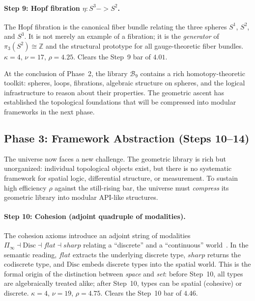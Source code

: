\documentclass[11pt,a4paper]{article}
\def\to{->}%
\def\flat{flat}%
\def\sharp{sharp}%
\theoremstyle{plain}
\theoremstyle{definition}
\theoremstyle{remark}
\newcommand{\Z}{\mathbb{Z}}
\newcommand{\Disc}{\mathrm{Disc}}
\newcommand{\B}{\mathcal{B}}
\begin{document}
\paragraph{Step 9: Hopf fibration $\eta : S^3 \to S^2$.}  The Hopf fibration is the canonical fiber bundle relating the three spheres $S^1$, $S^2$, and $S^3$.  It is not merely an example of a fibration; it is the \emph{generator} of $\pi_3(S^2) \cong \Z$ and the structural prototype for all gauge-theoretic fiber bundles.  $\kappa = 4$, $\nu = 17$, $\rho = 4.25$.  Clears the Step~9 bar of $4.01$.

At the conclusion of Phase~2, the library $\B_9$ contains a rich homotopy-theoretic toolkit: spheres, loops, fibrations, algebraic structure on spheres, and the logical infrastructure to reason about their properties.  The geometric ascent has established the topological foundations that will be compressed into modular frameworks in the next phase.


\subsection{Phase 3: Framework Abstraction (Steps 10--14)}
\label{sec:framework-abstraction}

The universe now faces a new challenge.  The geometric library is rich but unorganized: individual topological objects exist, but there is no systematic framework for spatial logic, differential structure, or measurement.  To sustain high efficiency $\rho$ against the still-rising bar, the universe must \emph{compress} its geometric library into modular API-like structures.

\paragraph{Step 10: Cohesion (adjoint quadruple of modalities).}  The cohesion axioms introduce an adjoint string of modalities $\Pi_{\!\infty} \dashv \Disc \dashv \flat \dashv \sharp$ relating a ``discrete'' and a ``continuous'' world~\cite{schreiber2013}.  In the semantic reading, $\flat$ extracts the underlying discrete type, $\sharp$ returns the codiscrete type, and $\Disc$ embeds discrete types into the spatial world.  This is the formal origin of the distinction between \emph{space} and \emph{set}: before Step~10, all types are algebraically treated alike; after Step~10, types can be spatial (cohesive) or discrete.  $\kappa = 4$, $\nu = 19$, $\rho = 4.75$.  Clears the Step~10 bar of $4.46$.
\end{document}
